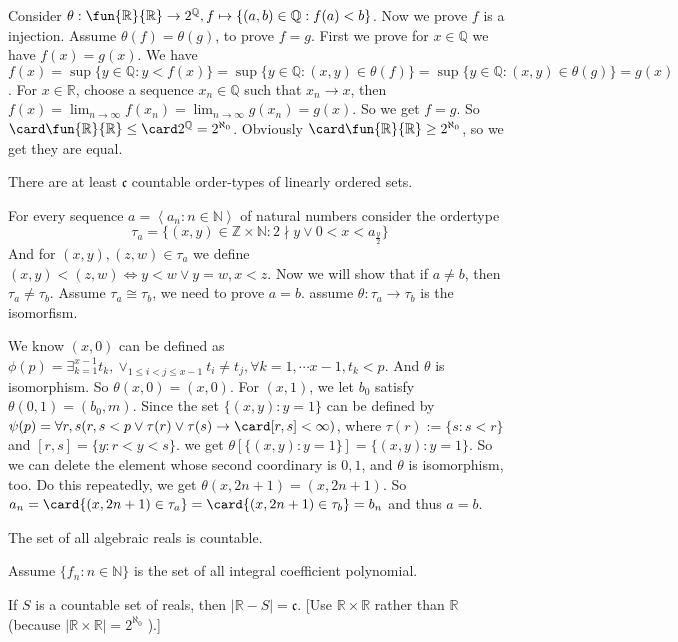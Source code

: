 \documentclass{ctexart}
\begin{document}
\begin{solution}
  Consider \(\theta:\fun{\mathbb{R}}{\mathbb{R}} \to 2^{\mathbb{Q}}, f \mapsto \{(a,b) \in \mathbb{Q}: f(a) < b\}\). 
  Now we prove \(f\) is a injection. 
  Assume \(\theta(f)=\theta(g)\), to prove \(f=g\). 
  First we prove for \(x\in \mathbb{Q}\) we have \(f(x)=g(x)\). 
  We have \(f(x)=\sup \{y \in \mathbb{Q}:y<f(x)\}=\sup\{y \in \mathbb{Q}:(x,y) \in \theta(f)\}=\sup\{y \in \mathbb{Q} : (x,y) \in \theta (g)\}=g(x)\).
  For \(x \in \mathbb{R}\), choose a sequence \(x_n \in \mathbb{Q}\) such that \(x_n \to x\), 
  then \(f(x)= \lim_{n \to \infty }f(x_n)=\lim_{n \to \infty }g(x_n)=g(x)\). 
  So we get \(f=g\). So \(\card \fun{\mathbb{R}}{\mathbb{R}} \leq \card 2^{\mathbb{Q}}=2^{\aleph_0}\).
  Obviously \(\card\fun{\mathbb{R}}{\mathbb{R}} \geq 2^{\aleph_0}\), so we get they are equal. 
\end{solution}
\begin{problem}
There are at least $\mathfrak{c}$ countable order-types of linearly ordered sets.
\end{problem}

\begin{solution}
For every sequence $a=\left\langle a_n: n \in \mathbb{N}\right\rangle$ of natural numbers consider the ordertype
$$
\tau_a=\{(x,y) \in \mathbb{Z}\times \mathbb{N}:2 \nmid y \vee 0<x<a_{\frac{y}{2}}\}
$$
And for \((x,y),(z,w) \in \tau_a\) we define \((x,y)<(z,w) \iff y<w \vee y=w,x<z\).
Now we will show that if $a \neq b$, then $\tau_a \neq \tau_b$. 
Assume \(\tau_a \cong \tau_b\), we need to prove \(a=b\). assume \(\theta:\tau_a \to \tau_b\) is the isomorfism. 

We know \((x,0)\) can be defined as \(\phi(p)=\exists_{k=1}^{x-1} t_k,\vee_{1 \leq i < j \leq x-1}t_i \neq t_j, \forall k=1,\cdots x-1, t_k<p\). 
And \(\theta\) is isomorphism. So \(\theta(x,0)=(x,0)\). 
For \((x,1)\), we let \(b_0\) satisfy \(\theta(0,1)=(b_0,m)\). 
Since the set \(\{(x,y):y=1\}\) can be defined by \(\psi(p)=\forall r,s(r,s<p \vee \tau(r)\vee \tau(s) \to \card[r,s] < \infty )\), 
where \(\tau(r):= \{s:s<r\}\) and \([r,s]=\{y:r<y<s\}\). 
we get \(\theta[\{(x,y):y=1\}]=\{(x,y):y=1\}\). 
So we can delete the element whose second coordinary is \(0,1\), and \(\theta\) is isomorphism, too. 
Do this repeatedly, we get \(\theta(x,2n+1)=(x,2n+1)\). 
So \(a_n=\card\{(x,2n+1)\in \tau_a\}=\card \{(x,2n+1) \in \tau_b\}=b_n\) and thus \(a=b\).
\end{solution}
\begin{problem}
The set of all algebraic reals is countable.
\end{problem}

\begin{solution}
  Assume \(\{f_n:n \in \mathbb{N}\}\) is the set of all integral coefficient polynomial.
  
\end{solution}
\begin{problem}
If $S$ is a countable set of reals, then $|\mathbb{R}-S|=\mathfrak{c}$.
[Use $\mathbb{R} \times \mathbb{R}$ rather than $\mathbb{R}$ (because $|\mathbb{R} \times \mathbb{R}|=2^{\aleph_0}$ ).]
\end{problem}
\end{document}
